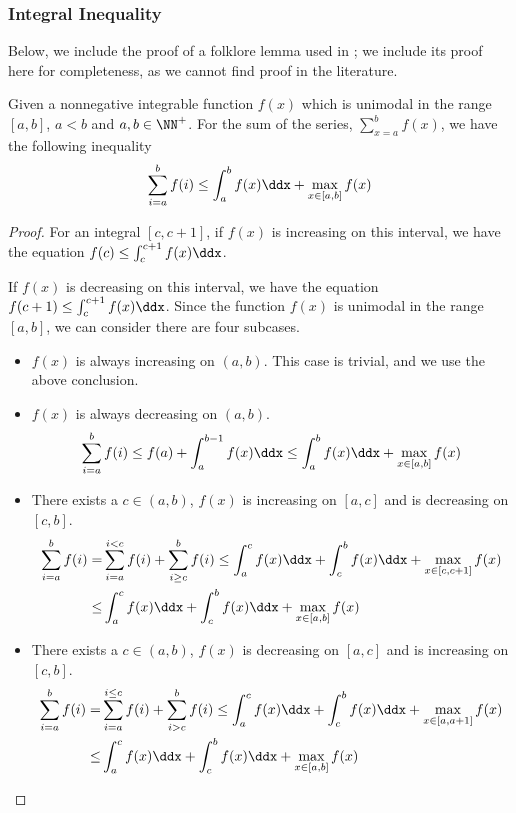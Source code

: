 \subsubsection{Integral Inequality}
Below, we include the proof of a folklore lemma used in \citet{jin2022finite}; we include its proof here for completeness, as we cannot find proof in the literature.

\begin{lemma} \label{lemma:integral-inequality}
    Given a nonnegative integrable function $f(x)$ which is unimodal in the range $[a, b]$, $a < b$ and $a, b \in \NN^+$.
    For the sum of the series, $\sum_{x=a}^b f(x)$, we have the following inequality
    \begin{align*}
        \sum_{i=a}^{b} f(i)
        \leq 
        \int_{a}^{b} f(x) \ddx +
        \max_{x\in[a, b]} f(x)
    \end{align*}
\end{lemma}
\begin{proof}
    For an integral $[c, c+1]$, if $f(x)$ is increasing on this interval, we have the equation $f(c) \leq \int_c^{c+1} f(x) \ddx$.
    
    If $f(x)$ is decreasing on this interval, we have the equation $f(c+1) \leq \int_c^{c+1} f(x) \ddx$.
    Since the function $f(x)$ is unimodal in the range $[a, b]$, we can consider there are four subcases.
    \begin{itemize}
        \item $f(x)$ is always increasing on $(a, b)$. This case is trivial, and we use the above conclusion.
        \item $f(x)$ is always decreasing on $(a, b)$.
        \begin{align*}
            \sum_{i=a}^{b} f(i) \leq f(a) + \int_a^{b-1} f(x) \ddx \leq \int_a^b f(x) \ddx + \max_{x\in[a, b]} f(x)
        \end{align*}
        \item There exists a $c \in (a, b)$, $f(x)$ is increasing on $[a, c]$ and is decreasing on $[c, b]$.
        \begin{align*}
            \sum_{i=a}^{b} f(i) 
            =& \sum_{i=a}^{i < c} f(i) + \sum_{i \geq c}^{b} f(i) 
            \leq \int_a^c f(x) \ddx + \int_c^{b} f(x) \ddx + \max_{x\in [c, c+1]} f(x)
            \\
            \leq& \int_a^c f(x) \ddx + \int_c^{b} f(x) \ddx + \max_{x\in [a, b]} f(x) 
        \end{align*}
        \item There exists a $c \in (a, b)$, $f(x)$ is decreasing on $[a, c]$ and is increasing on $[c, b]$.
        \begin{align*}
            \sum_{i=a}^{b} f(i) 
            =& \sum_{i=a}^{i \leq c} f(i) + \sum_{i > c}^{b} f(i) 
            \leq \int_a^c f(x) \ddx + \int_c^{b} f(x) \ddx + \max_{x\in [a, a+1]} f(x)
            \\
            \leq& \int_a^c f(x) \ddx + \int_c^{b} f(x) \ddx + \max_{x\in [a, b]} f(x) 
        \end{align*}
    \end{itemize}


\end{proof}
